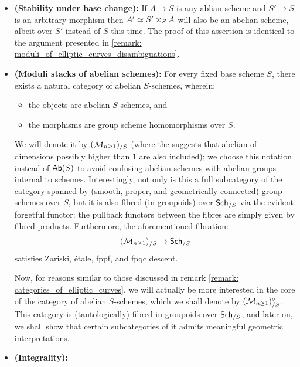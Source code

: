                 \begin{remark} \label{remark: geometry_of_abelian_varieties}
                    \noindent
                    \begin{itemize}
                        \item \textbf{(Stability under base change):} If $A \to S$ is any ablian scheme and $S' \to S$ is an arbitrary morphism then $A' \cong S' \x_S A$ will also be an abelian scheme, albeit over $S'$ instead of $S$ this time. The proof of this assertion is identical to the argument presented in \ref{remark: moduli_of_elliptic_curves_disambiguations}.
                        \item \textbf{(Moduli stacks of abelian schemes):} For every fixed base scheme $S$, there exists a natural category of abelian $S$-schemes, wherein:
                            \begin{itemize}
                                \item the objects are abelian $S$-schemes, and
                                \item the morphisms are group scheme homomorphisms over $S$.
                            \end{itemize}
                        We will denote it by $(\mathcal{M}_{n \geq 1})_{/S}$ (where the  suggests that abelian of dimensions possibly higher than $1$ are also included); we choose this notation instead of $\mathsf{Ab}(S)$ to avoid confusing abelian schemes with abelian groups internal to schemes. Interestingly, not only is this a full subcategory of the category spanned by (smooth, proper, and geometrically connected) group schemes over $S$, but it is also fibred (in groupoids) over $\mathsf{Sch}_{/S}$ via the evident forgetful functor: the pullback functors between the fibres are simply given by fibred products. Furthermore, the aforementioned fibration:
                            $$(\mathcal{M}_{n \geq 1})_{/S} \to \mathsf{Sch}_{/S}$$
                        satisfies Zariski, \'etale, fppf, and fpqc descent. 
                        
                        Now, for reasons similar to those discussed in remark \ref{remark: categories_of_elliptic_curves}, we will actually be more interested in the core of the category of abelian $S$-schemes, which we shall denote by $(\mathcal{M}_{n \geq 1})_{/S}^{\circ}$. This category is (tautologically) fibred in groupoids over $\mathsf{Sch}_{/S}$, and later on, we shall show that certain subcategories of it admits meaningful geometric interpretations.
                        \item \textbf{(Integrality):}
                    \end{itemize}
                \end{remark}
                
